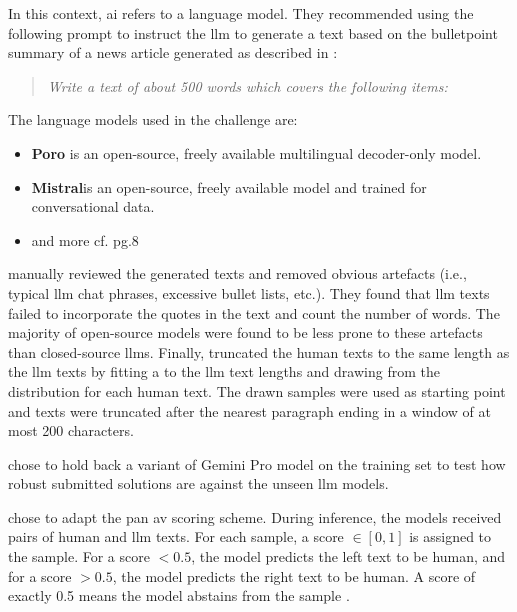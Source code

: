 In this context, \ac{ai} refers to a language model.
They recommended using the following prompt to instruct the \ac{llm} to generate a text 
based on the bulletpoint summary of a news article generated as described in \cite{pan_dataset_authorship_verification}:
\begin{quote}
    \textit{Write a text of about 500 words which covers the following items:}
\end{quote}
The language models used in the challenge are:
\begin{itemize}
    \item \textbf{Poro} is an open-source, freely available multilingual decoder-only model.
    \item \textbf{Mistral}is an open-source, freely available model and trained for conversational data.
    \item and more cf. pg.8 \cite{bevendorff_overview_2024}
\end{itemize}
\citet{bevendorff_overview_2024} manually reviewed the generated texts and removed obvious artefacts 
(i.e., typical \ac{llm} chat phrases, excessive bullet lists, etc.).
They found that \ac{llm} texts failed to incorporate the quotes in the text and count the number of words.
The majority of open-source models were found to be less prone to these artefacts than closed-source \acp{llm}.
Finally, \citet{bevendorff_overview_2024} truncated the human texts to the same length as the \ac{llm} texts by 
fitting a  to the \ac{llm} text lengths and drawing from the distribution for each human text.
The drawn samples were used as starting point and texts were truncated after the nearest paragraph ending in a window of at most 200 characters.

\citet{bevendorff_overview_2024} chose to hold back a variant of Gemini Pro model on the training set to test 
how robust submitted solutions are against the unseen \ac{llm} models.

\citet{bevendorff_overview_2024} chose to adapt the \ac{pan} \ac{av} scoring scheme.
During inference, the models received pairs of human and \ac{llm} texts.
For each sample, a score $\in [0, 1]$ is assigned to the sample.
For a score $<0.5$, the model predicts the left text to be human,
and for a score $>0.5$, the model predicts the right text to be human.
A score of exactly 0.5 means the model abstains from the sample \cite{bevendorff_overview_2024,kocher_unine_2015}.

